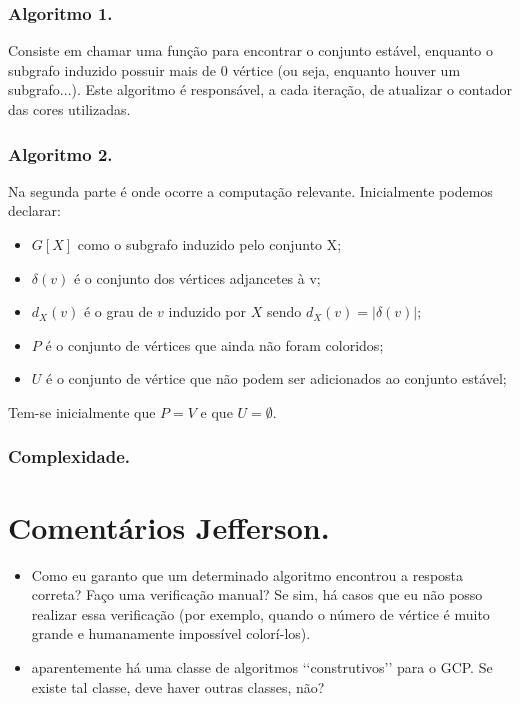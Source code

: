 \documentclass[a4paper,12pt]{article}
\begin{document}
\subsubsection{Algoritmo 1.}

Consiste em chamar uma função para encontrar o conjunto estável, enquanto o subgrafo induzido possuir mais de 0 vértice (ou seja, enquanto houver um subgrafo...). Este algoritmo é responsável, a cada iteração, de atualizar o contador das cores utilizadas.

\subsubsection{Algoritmo 2.}

Na segunda parte é onde ocorre a computação relevante. Inicialmente podemos declarar:

\begin{itemize}
\item $G[X]$ como o subgrafo induzido pelo conjunto X;
\item $\delta (v)$ é o conjunto dos vértices adjancetes à v;
\item $d_X(v)$ é o grau de $v$ induzido por $X$ sendo $d_X(v) = | \delta (v)|$;
\item $P$ é o conjunto de vértices que ainda não foram coloridos;
\item $U$ é o conjunto de vértice que não podem ser adicionados ao conjunto estável;
\end{itemize}

Tem-se inicialmente que $P = V$ e que $U = \emptyset$.

\subsubsection{Complexidade.}

\section{Comentários Jefferson.}

\begin{itemize}
\item Como eu garanto que um determinado algoritmo encontrou a resposta correta? Faço uma verificação manual? Se sim, há casos que eu não posso realizar essa verificação (por exemplo, quando o número de vértice é muito grande e humanamente impossível colorí-los).
\item aparentemente há uma classe de algoritmos \lq\lq{}construtivos\rq\rq{} para o GCP. Se existe tal classe, deve haver outras classes, não?
\end{itemize}

\nocite{*}


\end{document}
